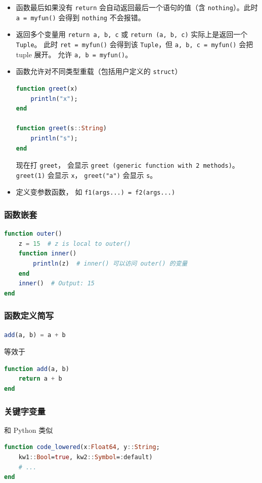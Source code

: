 \begin{itemize}
\item 函数最后如果没有 \verb`return` 会自动返回最后一个语句的值（含 \verb`nothing`）。此时 \verb`a = myfun()` 会得到 \verb`nothing` 不会报错。
\item 返回多个变量用 \verb`return a, b, c` 或 \verb`return (a, b, c)` 实际上是返回一个 \verb`Tuple`。 此时 \verb`ret = myfun()` 会得到该 \verb`Tuple`，但 \verb`a, b, c = myfun()` 会把 tuple 展开。 允许 \verb`a, b = myfun()`。
\item 函数允许对不同类型重载（包括用户定义的 \verb`struct`）
\begin{lstlisting}[language=julia]
function greet(x)
    println("x");
end

function greet(s::String)
    println("s");
end
\end{lstlisting}
现在打 \verb`greet`， 会显示 \verb`greet (generic function with 2 methods)`。 \verb`greet(1)` 会显示 \verb`x`， \verb`greet("a")` 会显示 \verb`s`。
\item 定义变参数函数， 如 \verb`f1(args...) = f2(args...)`
\end{itemize}

\subsubsection{函数嵌套}
\begin{lstlisting}[language=julia]
function outer()
    z = 15  # z is local to outer()
    function inner()
        println(z)  # inner() 可以访问 outer() 的变量
    end
    inner()  # Output: 15
end
\end{lstlisting}

\subsubsection{函数定义简写}

\begin{lstlisting}[language=julia]
add(a, b) = a + b
\end{lstlisting}
等效于
\begin{lstlisting}[language=julia]
function add(a, b)
    return a + b
end
\end{lstlisting}

\subsubsection{关键字变量}
和 Python 类似
\begin{lstlisting}[language=julia]
function code_lowered(x:Float64, y::String;
    kw1::Bool=true, kw2::Symbol=:default)
    # ...
end
\end{lstlisting}

